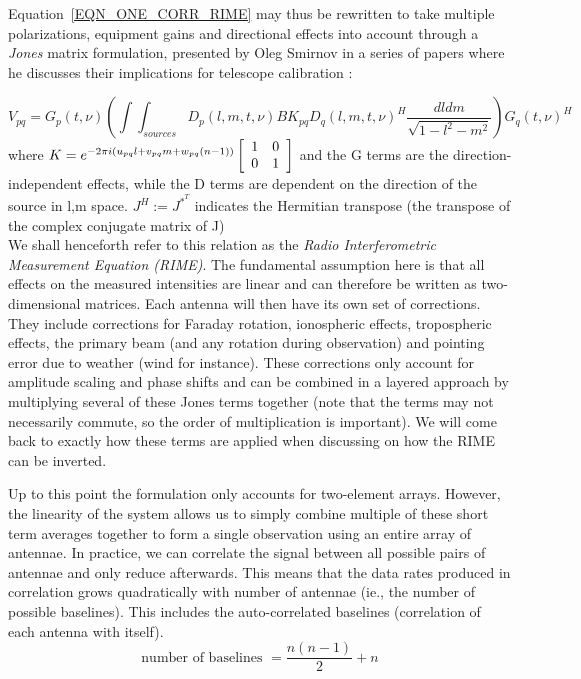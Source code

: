 Equation~\ref{EQN_ONE_CORR_RIME} may thus be rewritten to take multiple polarizations, equipment gains and directional effects into account through a \textit{Jones} matrix
formulation, presented by Oleg Smirnov in a series of papers where he discusses their implications for telescope calibration \cite{2011A&A...527A.106S,2011A&A...527A.107S,2011A&A...527A.108S,2011A&A...531A.159S}:

\begin{equation}
\label{eqn_RIME}
    V_{pq} = G_p(t,\nu)\left(\int\int_{sources}D_p(l,m,t,\nu)BK_{pq}D_q(l,m,t,\nu)^H\frac{dldm}{\sqrt{1-l^2-m^2}}\right)G_q(t,\nu)^H
\end{equation}
where $K = e^{-2\pi i(u_{pq}l+v_{pq}m+w_{pq}(n-1))}
    \left[\begin{array}{c c}
     1 & 0 \\
     0 & 1 \\
    \end{array}\right]$ and the G terms are the direction-independent effects, while the D terms are dependent on the direction of 
    the source in l,m space. $J^H:=J^{*^T}$ indicates the Hermitian transpose (the transpose of the complex conjugate matrix of J)\\
    
We shall henceforth refer to this relation as the \textit{Radio Interferometric Measurement Equation (RIME)}. 
The fundamental assumption here is that all effects on the measured intensities are linear and can therefore be 
written as two-dimensional matrices. Each antenna will then have its own set of corrections. They 
include corrections for Faraday rotation, ionospheric effects, tropospheric effects, the primary beam (and any rotation during
observation) and pointing error due to weather (wind for instance). These corrections only account for amplitude scaling and 
phase shifts and can be combined in a layered approach by multiplying several of these Jones terms together (note that the terms 
may not necessarily commute, so the order of multiplication is important). We will come back to exactly how these terms are applied
when discussing on how the RIME can be inverted.

Up to this point the formulation only accounts for two-element arrays. However, the linearity of the system allows us
to simply combine multiple of these short term averages together to form a single observation using an entire array of
antennae. In practice, we can correlate the signal between all possible pairs of antennae and only reduce afterwards. 
This means that the data rates produced in correlation grows quadratically with number of antennae (ie., the number of 
possible baselines). This includes the auto-correlated baselines (correlation of each antenna with itself).
\begin{equation}
  \text{number of baselines } = \frac{n(n-1)}{2} + n
\end{equation}

